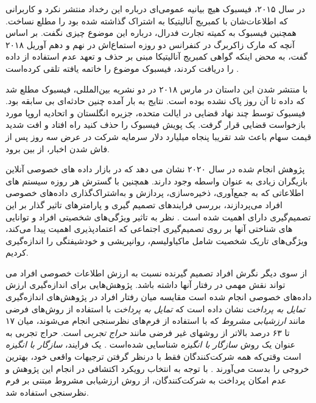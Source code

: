 در سال ۲۰۱۵، فیسبوک هیچ بیانیه عمومی‌ای درباره این رخداد منتشر نکرد و
کاربرانی که اطلاعات‌شان با کمبریج آنالیتیکا به اشتراک گذاشته شده
بود را مطلع نساخت. همچنین فیسبوک به کمیته تجارت فدرال، درباره این موضوع
چیزی نگفت. بر اساس آنچه که مارک زاکربرگ در کنفرانس دو روزه
استماع‌اش در نهم و دهم آوریل ۲۰۱۸ گفت، به محض اینکه گواهی کمبریج آنالیتیکا
مبنی بر حذف و تعهد عدم استفاده از داده را دریافت کردند، فیسبوک
موضوع را خاتمه یافته تلقی کرده‌است
\!\citep{spanFacebookCEOMark}.

با منتشر شدن این داستان در مارس ۲۰۱۸ در دو نشریه بین‌المللی، فیسبوک
مطلع شد که داده تا آن روز پاک نشده بوده است. نتایج به بار آمده
چنین حادثه‌ای بی سابقه بود. فیسبوک توسط چند نهاد قضایی در ایالت متحده،
جزیره انگلستان و اتحادیه اروپا مورد بازخواست قضایی قرار گرفت. یک پویش
فیسبوک را حذف کنید راه افتاد و افت شدید قیمت سهام باعث شد تقریبا پنجاه میلیارد دلار
سرمایه شرکت در عرض سه روز پس از فاش شدن اخبار، از بین برود.

پژوهش انجام شده در سال ۲۰۲۰ نشان می دهد که در بازار داده های خصوصی آنلاین بازیگران زیادی به عنوان واسطه وجود دارند.
\!\citep{agogoInvisibleMarketOnline2021}
همچنین با گسترش هر روزه سیستم های اطلاعاتی که به
جمع‌آوری، ذخیره‌سازی، پردازش و به‌اشتراک‌گذاری داده‌های
خصوصی افراد می‌پردازند، بررسی فرایندهای
تصمیم گیری و پارامتر‌های تاثیر گذار
بر این تصمیم‌گیری دارای اهمیت شده است
\!\citep{spiekermannValuesEthicsInformation2022}.
نظر به تاثیر ویژگی‌های شخصیتی افراد و توانایی های شناختی آنها بر روی تصمیم‌گیری اجتماعی که اعتمادپذیری اهمیت پیدا 
می‌کند، ویژگی‌های تاریک شخصیت شامل ماکیاولیسم، روانپریشی و خودشیفتگی را اندازه‌گیری کردیم.

از سوی دیگر نگرش افراد تصمیم گیرنده نسبت به ارزش اطلاعات خصوصی افراد می تواند نقش مهمی در رفتار آنها داشته باشد.
پژوهش‌هایی برای اندازه‌گیری ارزش داده‌های خصوصی انجام شده است
\!\citep{  fastValuePersonalData2021a,wesselsSellNotSell2019,tangHowChineseWeb2021}
\ifWillingnessToPay
  مقایسه میان رفتار افراد در پژوهش‌های اندازه‌گیری
  \textit{تمایل به پرداخت}
  نشان داده است که
  \textit{تمایل به پرداخت }
  با استفاده از روش‌های فرضی مانند
  \textit{ارزشيابی مشروط}
  که با استفاده از فرم‌های نظرسنجی انجام می‌شوند،
  میان ۱۷ تا ۶۳ درصد بالاتر
  از روشهای غیر فرضی مانند
  \textit{حراج تجربی}
  است.
  حراج تجربی به عنوان یک روش
  \textit{سازگار با انگیزه}
  شناسایی شده‌است
  \!\citep{martinez-carrascoComparingHypotheticalNonhypothetical2015}
  .
  یک فرایند،
  \textit{سازگار با انگیزه}
  است وقتی‌که همه شرکت‌کنندگان فقط  با درنظر گرفتن ترجیهات واقعی خود، بهترین خروجی را بدست می‌آورند
  \!\citep{nisanAlgorithmicGameTheory2007}
  \!. 
با توجه به انتخاب رویکرد اکتشافی در انجام این پژوهش و عدم  امکان پرداخت به شرکت‌کنندگان، از روش ارزشیابی مشروط 
مبتنی بر فرم نظرسنجی استفاده شد.

